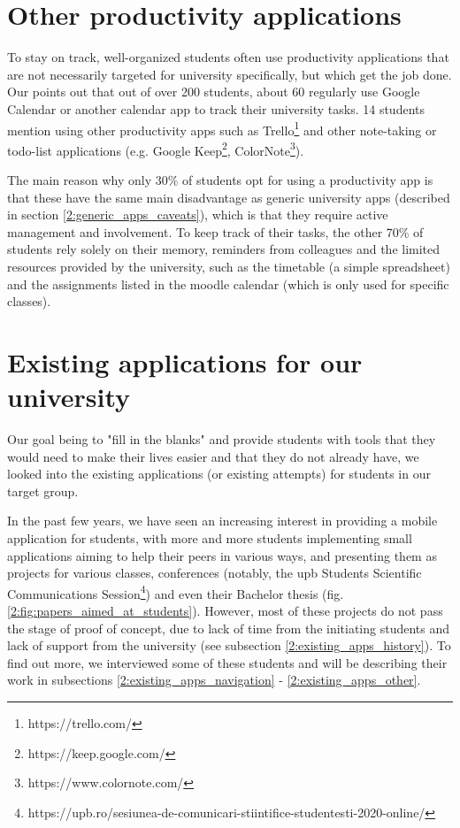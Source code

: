 \section{Other productivity applications} \label{2:other_apps}
    To stay on track, well-organized students often use productivity applications that are not necessarily targeted for university specifically, but which get the job done. Our \textbf{} points out that out of over 200 students, about 60 regularly use Google Calendar or another calendar app to track their university tasks. 14 students mention using other productivity apps such as Trello\footnote{https://trello.com/} and other note-taking or todo-list applications (e.g. Google Keep\footnote{https://keep.google.com/}, ColorNote\footnote{https://www.colornote.com/}).
    
    The main reason why only 30\% of students opt for using a productivity app is that these have the same main disadvantage as generic university apps (described in section \ref{2:generic_apps_caveats}), which is that they require active management and involvement. To keep track of their tasks, the other 70\% of students rely solely on their memory, reminders from colleagues and the limited resources provided by the university, such as the timetable (a simple spreadsheet) and the assignments listed in the \gls{moodle} calendar (which is only used for specific classes).

\section{Existing applications for our university} \label{2:existing_apps}
    Our goal being to "fill in the blanks" and provide students with tools that they would need to make their lives easier and that they do not already have, we looked into the existing applications (or existing attempts) for students in our target group.
    
    In the past few years, we have seen an increasing interest in providing a mobile application for students, with more and more students implementing small applications aiming to help their peers in various ways, and presenting them as projects for various classes, conferences (notably, the \acrshort{upb} Students Scientific Communications Session\footnote{https://upb.ro/sesiunea-de-comunicari-stiintifice-studentesti-2020-online/}) and even their Bachelor thesis (fig. \ref{2:fig:papers_aimed_at_students}). However, most of these projects do not pass the stage of proof of concept, due to lack of time from the initiating students and lack of support from the university (see subsection \ref{2:existing_apps_history}). To find out more, we interviewed some of these students and will be describing their work in subsections \ref{2:existing_apps_navigation} - \ref{2:existing_apps_other}.
    
